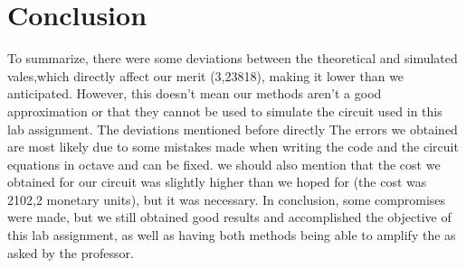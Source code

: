 \section{Conclusion}
\label{sec:conclusion}
To summarize, there were some deviations between the theoretical and simulated vales,which directly affect our merit (3,23818), making it lower than we anticipated. However, this doesn't mean our methods aren't a good approximation or that they cannot be used to simulate the circuit used in this lab assignment. The deviations mentioned before directly The errors we obtained are most likely due to some mistakes made when writing the code and the circuit equations in octave and can be fixed.
we should also mention that the cost we obtained for our circuit was slightly higher than we hoped for (the cost was 2102,2 monetary units), but it was necessary.
In conclusion, some compromises were made, but we still obtained good results and accomplished the objective of this lab assignment, as well as having both methods being able to amplify the as asked by the professor.
